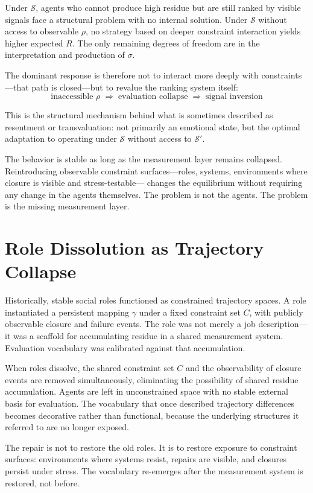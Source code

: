 \documentclass[12pt]{article}
\begin{document}
Under $\mathcal{S}$, agents who cannot produce high residue but are
still ranked by visible signals face a structural problem with no
internal solution. Under $\mathcal{S}$ without access to observable
$\rho$, no strategy based on deeper constraint interaction yields higher
expected $R$. The only remaining degrees of freedom are in the
interpretation and production of $\sigma$.

The dominant response is therefore not to interact more deeply with
constraints---that path is closed---but to revalue the ranking system
itself:
\[
  \text{inaccessible } \rho
  \;\Rightarrow\;
  \text{evaluation collapse}
  \;\Rightarrow\;
  \text{signal inversion}
\]

This is the structural mechanism behind what is sometimes described as
resentment or transvaluation: not primarily an emotional state, but the
optimal adaptation to operating under $\mathcal{S}$ without access to
$\mathcal{S}'$.

The behavior is stable as long as the measurement layer remains
collapsed. Reintroducing observable constraint surfaces---roles,
systems, environments where closure is visible and stress-testable---
changes the equilibrium without requiring any change in the agents
themselves. The problem is not the agents. The problem is the missing
measurement layer.

\section{Role Dissolution as Trajectory Collapse}

Historically, stable social roles functioned as constrained trajectory
spaces. A role instantiated a persistent mapping $\gamma$ under a fixed
constraint set $C$, with publicly observable closure and failure events.
The role was not merely a job description---it was a scaffold for
accumulating residue in a shared measurement system. Evaluation
vocabulary was calibrated against that accumulation.

When roles dissolve, the shared constraint set $C$ and the
observability of closure events are removed simultaneously, eliminating
the possibility of shared residue accumulation. Agents are left in
unconstrained space with no stable external basis for evaluation. The
vocabulary that once described trajectory differences becomes decorative
rather than functional, because the underlying structures it referred to
are no longer exposed.

The repair is not to restore the old roles. It is to restore exposure
to constraint surfaces: environments where systems resist, repairs are
visible, and closures persist under stress. The vocabulary re-emerges
after the measurement system is restored, not before.
\end{document}
